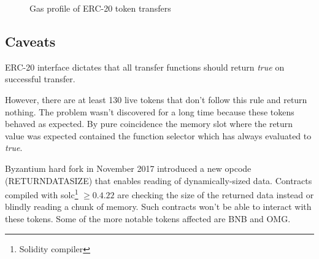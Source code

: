 \documentclass[12pt]{article}
\begin{document}
\begin{figure}[h]
\caption{Gas profile of ERC-20 token transfers}
\end{figure}


\subsection{Caveats}

ERC-20 interface dictates that all transfer functions should return \textit{true} on successful transfer.

However, there are at least 130 live tokens that don't follow this rule and return nothing.
The problem wasn't discovered for a long time because these tokens behaved as expected\cite{cremer}.
By pure coincidence the memory slot where the return value was expected contained the function selector which has always evaluated to \textit{true}.

Byzantium hard fork in November 2017 introduced a new opcode (RETURNDATASIZE) that enables reading of dynamically-sized data.
Contracts compiled with solc\footnote{Solidity compiler} $\geq 0.4.22$ are checking the size of the returned data instead or blindly reading a chunk of memory.
Such contracts won't be able to interact with these tokens.
Some of the more notable tokens affected are BNB and OMG.
\end{document}
